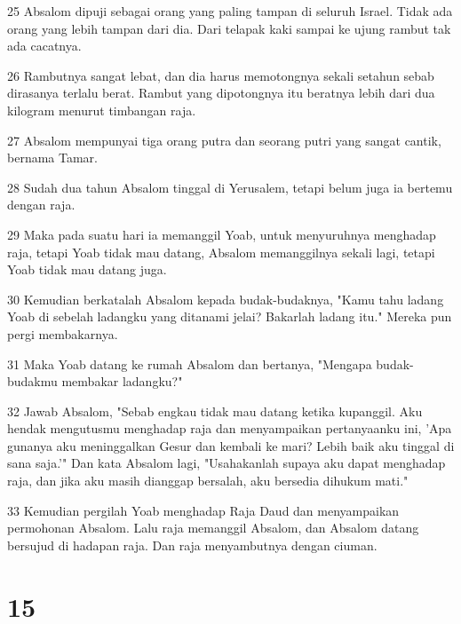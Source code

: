 \par 25 Absalom dipuji sebagai orang yang paling tampan di seluruh Israel. Tidak ada orang yang lebih tampan dari dia. Dari telapak kaki sampai ke ujung rambut tak ada cacatnya.
\par 26 Rambutnya sangat lebat, dan dia harus memotongnya sekali setahun sebab dirasanya terlalu berat. Rambut yang dipotongnya itu beratnya lebih dari dua kilogram menurut timbangan raja.
\par 27 Absalom mempunyai tiga orang putra dan seorang putri yang sangat cantik, bernama Tamar.
\par 28 Sudah dua tahun Absalom tinggal di Yerusalem, tetapi belum juga ia bertemu dengan raja.
\par 29 Maka pada suatu hari ia memanggil Yoab, untuk menyuruhnya menghadap raja, tetapi Yoab tidak mau datang, Absalom memanggilnya sekali lagi, tetapi Yoab tidak mau datang juga.
\par 30 Kemudian berkatalah Absalom kepada budak-budaknya, "Kamu tahu ladang Yoab di sebelah ladangku yang ditanami jelai? Bakarlah ladang itu." Mereka pun pergi membakarnya.
\par 31 Maka Yoab datang ke rumah Absalom dan bertanya, "Mengapa budak-budakmu membakar ladangku?"
\par 32 Jawab Absalom, "Sebab engkau tidak mau datang ketika kupanggil. Aku hendak mengutusmu menghadap raja dan menyampaikan pertanyaanku ini, 'Apa gunanya aku meninggalkan Gesur dan kembali ke mari? Lebih baik aku tinggal di sana saja.'" Dan kata Absalom lagi, "Usahakanlah supaya aku dapat menghadap raja, dan jika aku masih dianggap bersalah, aku bersedia dihukum mati."
\par 33 Kemudian pergilah Yoab menghadap Raja Daud dan menyampaikan permohonan Absalom. Lalu raja memanggil Absalom, dan Absalom datang bersujud di hadapan raja. Dan raja menyambutnya dengan ciuman.

\chapter{15}

